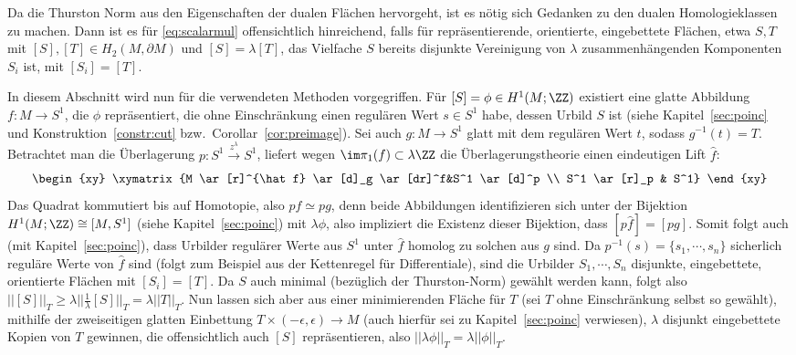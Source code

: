             Da die Thurston Norm aus den Eigenschaften der dualen Flächen hervorgeht, ist es nötig sich Gedanken zu den dualen Homologieklassen zu machen. Dann ist es für \eqref{eq:scalarmul} offensichtlich hinreichend, falls für repräsentierende, orientierte, eingebettete Flächen, etwa $S,T$ mit $[S],[T]\in H_2(M,\partial M)$ und $[S]=\lambda [T]$, das Vielfache $S$ bereits disjunkte Vereinigung von $\lambda$ zusammenhängenden Komponenten $S_i$ ist, mit $[S_i]=[T]$. 

            In diesem Abschnitt wird nun für die verwendeten Methoden vorgegriffen. Für $[S]=\phi \in H^1(M;\ZZ)$ existiert eine glatte Abbildung $f:M \to S^1$, die $\phi$ repräsentiert, die ohne Einschränkung einen regulären Wert $s\in S^1$ habe, dessen Urbild $S$ ist (siehe Kapitel~\ref{sec:poinc} und Konstruktion~\ref{constr:cut} bzw.~Corollar~\ref{cor:preimage}). Sei auch $g:M \to S^1$ glatt mit dem regulären Wert $t$, sodass $g^{-1}(t)=T$. Betrachtet man die Überlagerung $p: S^1 \stackrel {z^\lambda} \to  S^1$, liefert wegen $\im\pi_1(f) \subset \lambda \ZZ$ die Überlagerungstheorie einen eindeutigen Lift $\hat f$:
            \[
                \begin{xy}
                    \xymatrix{M \ar[r]^{\hat f} \ar[d]_g \ar[dr]^f&S^1 \ar[d]^p \\
                             S^1 \ar[r]_p & S^1}
                \end{xy}
            \]
            Das Quadrat kommutiert bis auf Homotopie, also $p\hat f \simeq p g$, denn beide Abbildungen identifizieren sich unter der Bijektion $H^1(M;\ZZ) \cong [M,S^1]$ (siehe Kapitel~\ref{sec:poinc}) mit $\lambda \phi$, also impliziert die Existenz dieser Bijektion, dass $[p\hat f] = [pg]$. Somit folgt auch (mit Kapitel~\ref{sec:poinc}), dass Urbilder regulärer Werte aus $S^1$ unter $\hat f$ homolog zu solchen aus $g$ sind. Da $p^{-1}(s)=\{s_1,\cdots,s_n\}$ sicherlich reguläre Werte von $\hat f$ sind (folgt zum Beispiel aus der Kettenregel für Differentiale), sind die Urbilder $S_1,\cdots,S_n$ disjunkte, eingebettete, orientierte Flächen mit $[S_i]=[T]$. Da $S$ auch minimal (bezüglich der Thurston-Norm) gewählt werden kann, folgt also $||[S]||_T \geq \lambda ||\frac 1\lambda [S]||_T = \lambda ||T||_T$. Nun lassen sich aber aus einer minimierenden Fläche für $T$ (sei $T$ ohne Einschränkung selbst so gewählt), mithilfe der zweiseitigen glatten Einbettung $T \times (-\epsilon,\epsilon) \to M$ (auch hierfür sei zu Kapitel~\ref{sec:poinc} verwiesen), $\lambda$ disjunkt eingebettete Kopien von $T$ gewinnen, die offensichtlich auch $[S]$ repräsentieren, also $||\lambda \phi||_T = \lambda ||\phi||_T$. 


